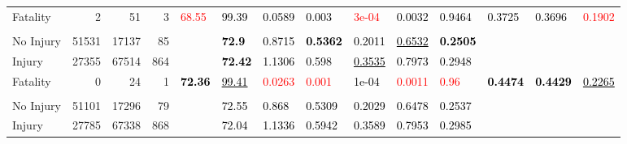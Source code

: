 \documentclass[]{elsarticle} %
\begin{document}
\begin{table}
{\begin{tabular}[t]{lrrrllllllllll}
Fatality & 2 & 51 & 3 & \multirow{-3}{*}{\raggedright\arraybackslash \textcolor{red}{68.55}} & \textcolor{black}{99.39} & \textcolor{black}{0.0589} & \textcolor{black}{0.003} & \textcolor{red}{3e-04} & \textcolor{black}{0.0032} & \textcolor{black}{0.9464} & \multirow{-3}{*}{\raggedright\arraybackslash \textcolor{black}{0.3725}} & \multirow{-3}{*}{\raggedright\arraybackslash \textcolor{black}{0.3696}} & \multirow{-3}{*}{\raggedright\arraybackslash \textcolor{red}{0.1902}}\\
\cmidrule{1-14}
\addlinespace[0.3em]
\multicolumn{14}{l}{\textbf{Model 2}}\\
\hspace{1em}No Injury & 51531 & 17137 & 85 &  & \textcolor{black}{\textbf{72.9}} & \textcolor{black}{0.8715} & \textcolor{black}{\textbf{0.5362}} & \textcolor{black}{0.2011} & \textcolor{black}{\underline{0.6532}} & \textcolor{black}{\textbf{0.2505}} &  &  & \\

\hspace{1em}Injury & 27355 & 67514 & 864 &  & \textcolor{black}{\textbf{72.42}} & \textcolor{black}{1.1306} & \textcolor{black}{0.598} & \textcolor{black}{\underline{0.3535}} & \textcolor{black}{0.7973} & \textcolor{black}{0.2948} &  &  & \\

Fatality & 0 & 24 & 1 & \multirow{-3}{*}{\raggedright\arraybackslash \textcolor{black}{\textbf{72.36}}} & \textcolor{black}{\underline{99.41}} & \textcolor{red}{0.0263} & \textcolor{red}{0.001} & \textcolor{black}{1e-04} & \textcolor{red}{0.0011} & \textcolor{red}{0.96} & \multirow{-3}{*}{\raggedright\arraybackslash \textcolor{black}{\textbf{0.4474}}} & \multirow{-3}{*}{\raggedright\arraybackslash \textcolor{black}{\textbf{0.4429}}} & \multirow{-3}{*}{\raggedright\arraybackslash \textcolor{black}{\underline{0.2265}}}\\
\cmidrule{1-14}
\addlinespace[0.3em]
\multicolumn{14}{l}{\textbf{Model 3}}\\
\hspace{1em}No Injury & 51101 & 17296 & 79 &  & \textcolor{black}{72.55} & \textcolor{black}{0.868} & \textcolor{black}{0.5309} & \textcolor{black}{0.2029} & \textcolor{black}{0.6478} & \textcolor{black}{0.2537} &  &  & \\

\hspace{1em}Injury & 27785 & 67338 & 868 &  & \textcolor{black}{72.04} & \textcolor{black}{1.1336} & \textcolor{black}{0.5942} & \textcolor{black}{0.3589} & \textcolor{black}{0.7953} & \textcolor{black}{0.2985} &  &  & \\


\end{tabular}}
\end{table}
\end{document}
